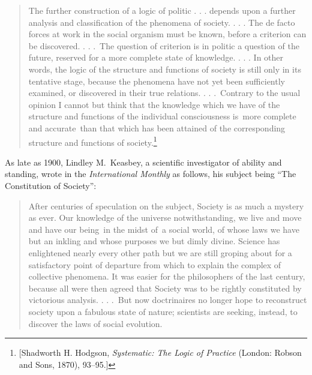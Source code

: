 \documentclass[openany,nobib]{tufte-book}
\begin{document}
\begin{quote}
The further construction of a logic of politic . . . depends upon a
further analysis and classification of the phenomena of society. . . .
The de facto forces at work in the social organism must be known, before
a criterion can be discovered. . . .~The question of criterion is in
politic a question of the future, reserved for a more complete state of
knowledge. . . . In other words, the logic of the structure and
functions of society is still only in its tentative stage, because the
phenomena have not yet been sufficiently examined, or discovered in
their true relations. . . .~Contrary to the usual opinion I cannot but
think that the knowledge which we have of the structure and functions of
the individual consciousness is~more complete and accurate~than that
which has been attained of the corresponding structure and functions of
society.\footnote{{[}Shadworth H. Hodgson, \emph{Systematic: The Logic
  of Practice} (London: Robson and Sons, 1870), 93--95.{]}} ~
\end{quote}

As late as 1900, Lindley M.~Keasbey, a scientific investigator of
ability and standing, wrote in the \emph{International Monthly} as
follows, his subject being ``The Constitution of Society'':~

\begin{quote}
After centuries of speculation on the subject, Society is as much a
mystery as ever. Our knowledge of the universe notwithstanding, we live
and move and have our being~in the midst of~a social world, of whose
laws we have but an inkling and whose purposes we but dimly divine.
Science has enlightened nearly every other path but we are still groping
about for a satisfactory point of departure from which to explain the
complex of collective phenomena. It was easier for the philosophers of
the last century, because all were then agreed that Society was to be
rightly constituted by victorious analysis. . . .~But now doctrinaires
no longer hope to reconstruct society upon a fabulous state of nature;
scientists are seeking, instead, to discover the laws of social
evolution.~
\end{quote}
\end{document}
